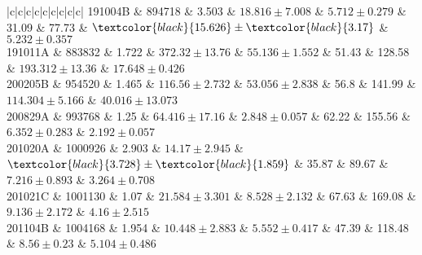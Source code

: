 \documentclass[prd,nofootinbib,preprintnumbers,floatfix]{revtex4}  %
\newcommand{\rthis}[1]{\textcolor{black}{#1}}
\begin{document}
\begin{center}
\begin{longtable*}{|c|c|c|c|c|c|c|c|c|}
191004B	&	894718	&	3.503	&	$	18.816	\pm	7.008	$	&	$	5.712	\pm	0.279	$	&	31.09	&	77.73	&	$	\rthis{15.626}	\pm	\rthis{3.17}	$	&	$	5.232	\pm	0.357	$	\\
191011A	&	883832	&	1.722	&	$	372.32	\pm	13.76	$	&	$	55.136	\pm	1.552	$	&	51.43	&	128.58	&	$	193.312	\pm	13.36	$	&	$	17.648	\pm	0.426	$	\\
200205B	&	954520	&	1.465	&	$	116.56	\pm	2.732	$	&	$	53.056	\pm	2.838	$	&	56.8	&	141.99	&	$	114.304	\pm	5.166	$	&	$	40.016	\pm	13.073	$	\\
200829A	&	993768	&	1.25	&	$	64.416	\pm	17.16	$	&	$	2.848	\pm	0.057	$	&	62.22	&	155.56	&	$	6.352	\pm	0.283	$	&	$	2.192	\pm	0.057	$	\\
201020A	&	1000926	&	2.903	&	$	14.17	\pm	2.945	$	&	$	\rthis{3.728}	\pm	\rthis{1.859}	$	&	35.87	&	89.67	&	$	7.216	\pm	0.893	$	&	$	3.264	\pm	0.708	$	\\
201021C	&	1001130	&	1.07	&	$	21.584	\pm	3.301	$	&	$	8.528	\pm	2.132	$	&	67.63	&	169.08	&	$	9.136	\pm	2.172	$	&	$	4.16	\pm	2.515	$	\\
201104B	&	1004168	&	1.954	&	$	10.448	\pm	2.883	$	&	$	5.552	\pm	0.417	$	&	47.39	&	118.48	&	$	8.56	\pm	0.23	$	&	$	5.104	\pm	0.486	$	\\

\hline 
\end{longtable*}
\end{center}



\end{document}
